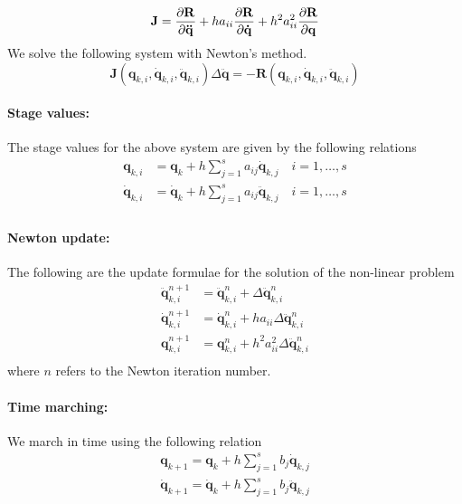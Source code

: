 \documentclass[pdftex,11pt,letter]{article}
\begin{document}
\begin{multicols}{2}
\begin{equation}
  \mathbf{J} = \dfrac{\partial \mathbf{R}}{\partial \mathbf{\ddot{q}}} + h a_{ii}
  \dfrac{\partial \mathbf{R}}{\partial \mathbf{\dot{q}}} + h^2 a_{ii}^2
  \dfrac{\partial \mathbf{R}}{\partial \mathbf{{q}}}
\end{equation}
We solve the following system with Newton's method.
\begin{equation}
 \mathbf{J}
 \left(\mathbf{q}_{k,i},\mathbf{\dot{q}}_{k,i},\mathbf{\ddot{q}}_{k,i}\right)
 \Delta\mathbf{\ddot{q}} = -\mathbf{R}
 \left(\mathbf{q}_{k,i},\mathbf{\dot{q}}_{k,i},\mathbf{\ddot{q}}_{k,i}\right)
\end{equation}

\paragraph{Stage values:}
The stage values for the above system are given by the following relations
\begin{equation}
  \begin{split}
    \mathbf{q}_{k,i}  & = \mathbf{q}_{k} + h \sum_{j=1}^s a_{ij} \mathbf{\dot{q}}_{k,j} \quad i = 1,\ldots,s \\
    \mathbf{\dot{q}}_{k,i}  & = \mathbf{\dot{q}}_{k} + h \sum_{j=1}^s a_{ij} \mathbf{\ddot{q}}_{k,j} \quad i = 1,\ldots,s \\
  \end{split}
\end{equation}

\paragraph{Newton update:}
The following are the update formulae for the solution of the non-linear problem
\begin{equation}\label{newton_update2}
  \begin{split}
    \mathbf{\ddot{q}}_{k,i}^{n+1} & = \mathbf{\ddot{q}}_{k,i}^{n} +
    \Delta\mathbf{\ddot{q}}_{k,i}^{n} \\
    \mathbf{\dot{q}}_{k,i}^{n+1} & = \mathbf{\dot{q}}_{k,i}^n + h a_{ii}
    \Delta\mathbf{\ddot{q}}_{k,i}^n \\
    \mathbf{{q}}_{k,i}^{n+1} & = \mathbf{{q}}_{k,i}^n + h^2 a_{ii}^2
    \Delta\mathbf{\ddot{q}}_{k,i}^n \\
  \end{split}
\end{equation}
where $n$ refers to the Newton iteration number.

\paragraph{Time marching:}
We march in time using the following relation
\begin{equation}
  \begin{split}
  \mathbf{q}_{k+1} = \mathbf{q}_{k} +h \sum_{j=1}^s b_j \mathbf{\dot{q}}_{k,j} \\
  \mathbf{\dot{q}}_{k+1} = \mathbf{\dot{q}}_{k} +h \sum_{j=1}^s b_j \mathbf{\ddot{q}}_{k,j} \\
  \end{split}
\end{equation}


\end{multicols}
\end{document}
